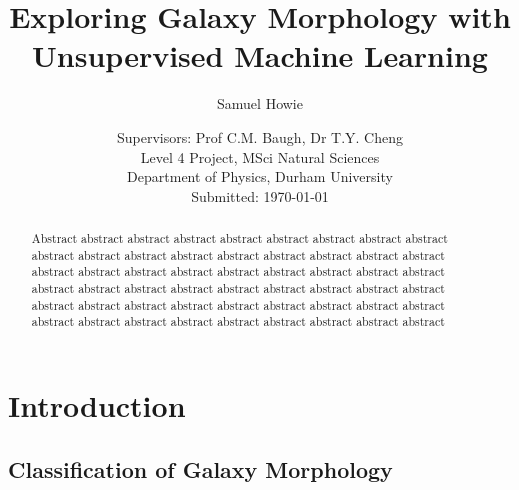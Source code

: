 \documentclass[12pt, onecolumn]{article}
\title{Exploring Galaxy Morphology with Unsupervised Machine Learning}
\author{Samuel Howie}
\date{Supervisors: Prof C.M. Baugh, Dr T.Y. Cheng\\ \vspace{5mm} Level 4 Project, MSci Natural Sciences \\Department of Physics, Durham University \\ \vspace{5mm} Submitted: \today{}}
\begin{document}
                     

    
\maketitle




\begin{abstract}              

Abstract abstract abstract abstract abstract abstract abstract abstract abstract abstract abstract abstract abstract abstract abstract abstract abstract abstract abstract abstract abstract abstract abstract abstract abstract abstract abstract abstract abstract abstract abstract abstract abstract abstract abstract abstract abstract abstract abstract abstract abstract abstract abstract abstract abstract abstract abstract abstract abstract abstract abstract abstract abstract abstract 

\end{abstract}

\newpage

\tableofcontents


\newpage

\section{Introduction}


    \subsection{Classification of Galaxy Morphology}
\end{document}
